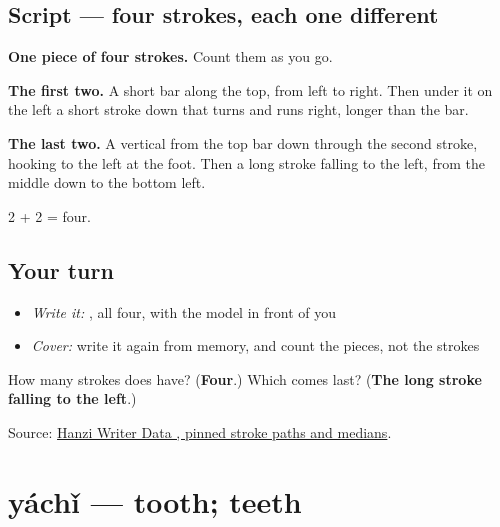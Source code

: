 \subsection*{Script — four strokes, each one different}

\begin{quote}
\end{quote}

\textbf{One piece of four strokes.} Count them as you go.

\textbf{The first two.} A short bar along the top, from left to right. Then under it on the left a short stroke down that turns and runs right, longer than the bar.

\textbf{The last two.} A vertical from the top bar down through the second stroke, hooking to the left at the foot. Then a long stroke falling to the left, from the middle down to the bottom left.

2 + 2 = four.

\subsection*{Your turn}
\begin{itemize}
\raggedright
  \item \emph{Write it:} , all four, with the model in front of you
  \item \emph{Cover:} write it again from memory, and count the pieces, not the strokes
\end{itemize}

\begin{tcolorbox}[breakable,colback=teal!4,colframe=teal!35!black,title={Before you move on}]
How many strokes does  have? (\textbf{Four}.) Which comes last? (\textbf{The long stroke falling to the left}.)

Source: \href{https://raw.githubusercontent.com/chanind/hanzi-writer-data/68d10a4b21150cae5e1ebbd223eed289cf32d90c/data/\%E7\%89\%99.json}{Hanzi Writer Data , pinned stroke paths and medians}.
\end{tcolorbox}
\section[yáchǐ]{yáchǐ — tooth; teeth}

\label{lesson:ZH-C473-yachi}



